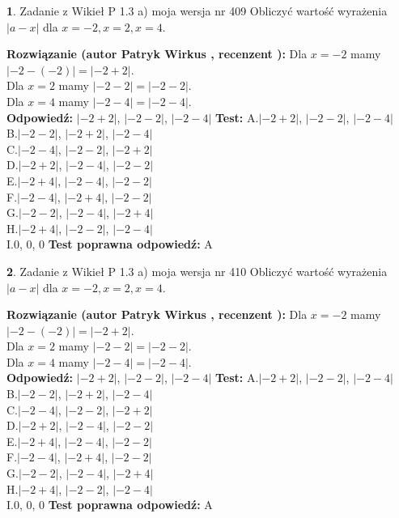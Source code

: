 \documentclass[12pt, a4paper]{article}
\theoremstyle{definition} %
\newtheorem{zad}{}
\newcommand{\zadStart}[1]{\begin{zad}#1\newline}
\newcommand{\zadStop}{\end{zad}}
\newcommand{\rozwStart}[2]{\noindent \textbf{Rozwiązanie (autor #1 , recenzent #2): }\newline}
\newcommand{\rozwStop}{\newline}
\newcommand{\odpStart}{\noindent \textbf{Odpowiedź:}\newline}
\newcommand{\odpStop}{\newline}
\newcommand{\testStart}{\noindent \textbf{Test:}\newline}
\newcommand{\testStop}{\newline}
\newcommand{\kluczStart}{\noindent \textbf{Test poprawna odpowiedź:}\newline}
\newcommand{\kluczStop}{\newline}
\begin{document}
\zadStart{Zadanie z Wikieł P 1.3 a) moja wersja nr 409}
Obliczyć wartość wyrażenia $|a - x|$ dla $x=-2,x=2,x=4$.
\zadStop
\rozwStart{Patryk Wirkus}{}
Dla $x = -2$ mamy $|-2 - (-2)| = |-2 + 2|$.\\
Dla $x = 2$ mamy $|-2 - 2| = |-2 - 2|$.\\
Dla $x = 4$ mamy $|-2 - 4| = |-2 - 4|$.\\
\rozwStop
\odpStart
$|-2 + 2|$, $|-2 - 2|$, $|-2 - 4|$
\odpStop
\testStart
A.$|-2 + 2|$, $|-2 - 2|$, $|-2 - 4|$\\
B.$|-2 - 2|$, $|-2 + 2|$, $|-2 - 4|$\\
C.$|-2 - 4|$, $|-2 - 2|$, $|-2 + 2|$\\
D.$|-2 + 2|$, $|-2 - 4|$, $|-2 - 2|$\\
E.$|-2 + 4|$, $|-2 - 4|$, $|-2 - 2|$\\
F.$|-2 - 4|$, $|-2 + 4|$, $|-2 - 2|$\\
G.$|-2 - 2|$, $|-2 - 4|$, $|-2 + 4|$\\
H.$|-2 + 4|$, $|-2 - 2|$, $|-2 - 4|$\\
I.$0$, $0$, $0$
\testStop
\kluczStart
A
\kluczStop



\zadStart{Zadanie z Wikieł P 1.3 a) moja wersja nr 410}
Obliczyć wartość wyrażenia $|a - x|$ dla $x=-2,x=2,x=4$.
\zadStop
\rozwStart{Patryk Wirkus}{}
Dla $x = -2$ mamy $|-2 - (-2)| = |-2 + 2|$.\\
Dla $x = 2$ mamy $|-2 - 2| = |-2 - 2|$.\\
Dla $x = 4$ mamy $|-2 - 4| = |-2 - 4|$.\\
\rozwStop
\odpStart
$|-2 + 2|$, $|-2 - 2|$, $|-2 - 4|$
\odpStop
\testStart
A.$|-2 + 2|$, $|-2 - 2|$, $|-2 - 4|$\\
B.$|-2 - 2|$, $|-2 + 2|$, $|-2 - 4|$\\
C.$|-2 - 4|$, $|-2 - 2|$, $|-2 + 2|$\\
D.$|-2 + 2|$, $|-2 - 4|$, $|-2 - 2|$\\
E.$|-2 + 4|$, $|-2 - 4|$, $|-2 - 2|$\\
F.$|-2 - 4|$, $|-2 + 4|$, $|-2 - 2|$\\
G.$|-2 - 2|$, $|-2 - 4|$, $|-2 + 4|$\\
H.$|-2 + 4|$, $|-2 - 2|$, $|-2 - 4|$\\
I.$0$, $0$, $0$
\testStop
\kluczStart
A
\kluczStop
\end{document}
